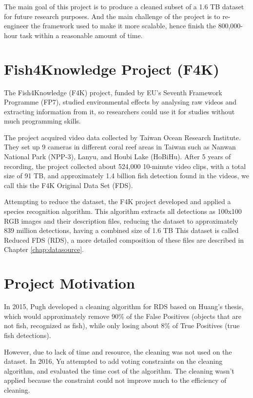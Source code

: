 \documentclass[bsc,logo,twoside,fullspacing,parskip]{infthesis}
\begin{document}

The main goal of this project is to produce a cleaned subset of a 1.6 TB dataset for future research purposes. And the main challenge of the project is to re-engineer the framework used to make it more scalable, hence finish the 800,000-hour task within a reasonable amount of time.

\section{Fish4Knowledge Project (F4K)}

The Fish4Knowledge (F4K) project, funded by EU's Seventh Framework Programme (FP7), studied environmental effects by analysing raw videos and extracting information from it, so researchers could use it for studies without much programming skills. 

The project acquired video data collected by Taiwan Ocean Research Institute. 
They set up 9 cameras in different coral reef areas in Taiwan such as Nanwan National Park (NPP-3), Lanyu, and Houbi Lake (HoBiHu). 
After 5 years of recording, the project collected about 524,000 10-minute video clips, with a total size of 91 TB, and approximately 1.4 billion fish detection found in the videos, we call this the F4K Original Data Set (FDS). 

Attempting to reduce the dataset, the F4K project developed and applied a species recognition algorithm. 
This algorithm extracts all detections as 100x100 RGB images and their description files, reducing the dataset to approximately 839 million detections, having a combined size of 1.6 TB
This dataset is called Reduced FDS (RDS), a more detailed composition of these files are described in Chapter \ref{chap:datasource}.

\section{Project Motivation}

In 2015, Pugh\cite{Pugh} developed a cleaning algorithm for RDS based on Huang's thesis\cite{Huang}, which would approximately remove 90\% of the False Positives (objects that are not fish, recognized as fish), while only losing about 8\% of True Positives (true fish detections). 

However, due to lack of time and resource, the cleaning was not used on the dataset.
In 2016, Yu\cite{Yu} attempted to add voting constraints on the cleaning algorithm, and evaluated the time cost of the algorithm.
The cleaning wasn't applied because the constraint could not improve much to the efficiency of cleaning.
\end{document}
